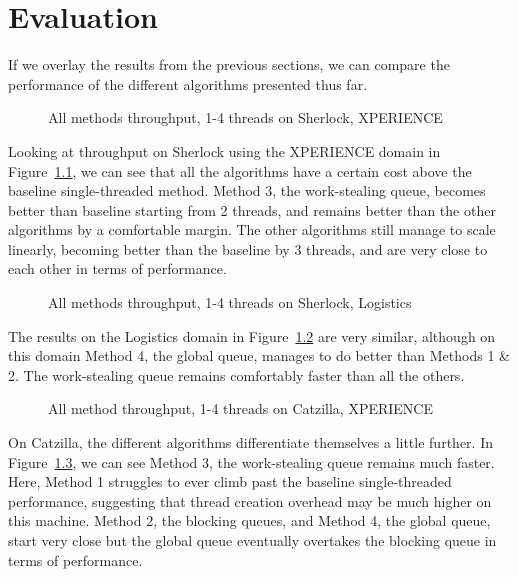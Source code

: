 \chapter{Evaluation}

If we overlay the results from the previous sections, we can compare the performance of the different algorithms presented thus far. 

\begin{figure}[!htbp]
\begin{centering}
\texttt{[image: \{\{images/threads-xper5-sherlock-all-2]}}}
\end{centering}
\caption{All methods throughput, 1-4 threads on Sherlock, XPERIENCE}
\label{fig:thread-sax-2}
\end{figure}

Looking at throughput on Sherlock using the XPERIENCE domain in Figure~\ref{fig:thread-sax-2}, we can see that all the algorithms have a certain cost above the baseline single-threaded method. Method 3, the work-stealing queue, becomes better than baseline starting from 2 threads, and remains better than the other algorithms by a comfortable margin. The other algorithms still manage to scale linearly, becoming better than the baseline by 3 threads, and are very close to each other in terms of performance.

\begin{figure}[!htbp]
\begin{centering}
\texttt{[image: \{\{images/threads-log3-sherlock-all-2]}}}
\end{centering}
\caption{All methods throughput, 1-4 threads on Sherlock, Logistics}
\label{fig:thread-sal-2}
\end{figure}

The results on the Logistics domain in Figure~\ref{fig:thread-sal-2} are very similar, although on this domain Method 4, the global queue, manages to do better than Methods 1 \& 2. The work-stealing queue remains comfortably faster than all the others.

\begin{figure}[!htbp]
\begin{centering}
\texttt{[image: \{\{images/threads-xper5-catzilla.inf.ed.ac.uk-all-2]}}}
\end{centering}
\caption{All method throughput, 1-4 threads on Catzilla, XPERIENCE}
\label{fig:thread-cax-2}
\end{figure}

On Catzilla, the different algorithms differentiate themselves a little further. In Figure~\ref{fig:thread-cax-2}, we can see Method 3, the work-stealing queue remains much faster. Here, Method 1 struggles to ever climb past the baseline single-threaded performance, suggesting that thread creation overhead may be much higher on this machine. Method 2, the blocking queues, and Method 4, the global queue, start very close but the global queue eventually overtakes the blocking queue in terms of performance.

